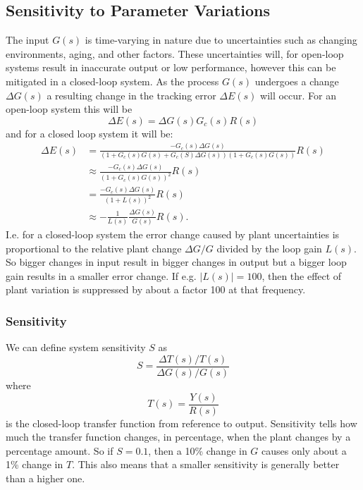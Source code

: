 \subsection{Sensitivity to Parameter Variations}
The input $G(s)$ is time-varying in nature due to uncertainties such as changing environments, aging, and other factors.
These uncertainties will, for open-loop systems result in inaccurate output or low performance, however this can be mitigated in a closed-loop system.
As the process $G(s)$ undergoes a change $\Delta G(s)$ a resulting change in the tracking error $\Delta E(s)$ will occur.
For an open-loop system this will be
\begin{equation*}
  \Delta E(s) = \Delta G(s) G_c(s) R(s)
\end{equation*}
and for a closed loop system it will be:
\begin{align*}
  \Delta E(s) &= \frac{- G_c (s) \Delta G(s)}{\left( 1 + G_c(s) G(s) + G_c(S) \Delta G(s) \right) \left( 1 + G_c (s) G(s) \right)} R(s) \\
              &\approx \frac{- G_c (s) \Delta G(s)}{ \left(  1 + G_c(s) G(s) \right)^2} R(s) \\
    &= \frac{- G_c(s) \Delta G(s)}{\left( 1 + L(s) \right)^2}R(s) \\
    &\approx - \frac{1}{L(s)} \frac{\Delta G(s)}{G(s)} R(s)
.\end{align*}
I.e. for a closed-loop system the error change caused by plant uncertainties is proportional to the relative plant change $\Delta G / G $ divided by the loop gain $L(s)$.
So bigger changes in input result in bigger changes in output but a bigger loop gain results in a smaller error change. 
If e.g. $\left| L(s) \right| = 100$, then the effect of plant variation is suppressed by about a factor 100 at that frequency.

\subsubsection{Sensitivity}
We can define system sensitivity $S$ as
\begin{equation*}
  S = \frac{\Delta T(s) / T(s)}{\Delta G(s) / G(s)}
\end{equation*}
where
\begin{equation*}
  T(s) = \frac{Y(s)}{R(s)}
\end{equation*}
is the closed-loop transfer function from reference to output.
Sensitivity tells how much the transfer function changes, in percentage, when the plant changes by a percentage amount.
So if $S = \num{0,1}$, then a 10\% change in $G$ causes only about a 1\% change in $T$.
This also means that a smaller sensitivity is generally better than a higher one.

